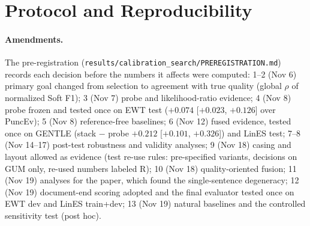 
\section{Protocol and Reproducibility}
\label{app:protocol}

\paragraph{Amendments.} The pre-registration (\texttt{results/calibration\_search/PREREGISTRATION.md}) records each
decision before the numbers it affects were computed:
1--2 (Nov 6) primary goal changed from selection to agreement with true quality (global $\rho$ of normalized Soft F1);
3 (Nov 7) probe and likelihood-ratio evidence;
4 (Nov 8) probe frozen and tested once on EWT test ($+0.074$ [$+0.023$, $+0.126$] over PuncEv);
5 (Nov 8) reference-free baselines;
6 (Nov 12) fused evidence, tested once on GENTLE (stack $-$ probe $+0.212$ [$+0.101$, $+0.326$]) and LinES test;
7--8 (Nov 14--17) post-test robustness and validity analyses;
9 (Nov 18) casing and layout allowed as evidence (test re-use rules: pre-specified variants, decisions on GUM only,
re-used numbers labeled R);
10 (Nov 18) quality-oriented fusion;
11 (Nov 19) analyses for the paper, which found the single-sentence degeneracy;
12 (Nov 19) document-end scoring adopted and the final evaluator tested once on EWT dev and LinES train+dev;
13 (Nov 19) natural baselines and the controlled sensitivity test (post hoc).


